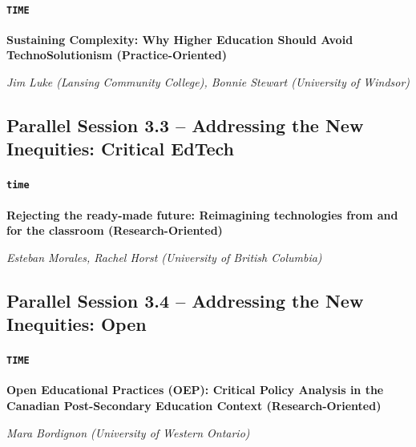 \documentclass[
]{book}
\begin{document}
\begin{secondary}
\hypertarget{time}{%
\paragraph{\texorpdfstring{\texttt{TIME}}{TIME}}\label{time}}

\textbf{Sustaining Complexity: Why Higher Education Should Avoid
TechnoSolutionism (Practice-Oriented)}

\emph{Jim Luke (Lansing Community College), Bonnie Stewart (University
of Windsor)}
\end{secondary}

\hypertarget{parallel-session-3.3-addressing-the-new-inequities-critical-edtech}{%
\subsection*{Parallel Session 3.3 -- Addressing the New Inequities: Critical EdTech}\label{parallel-session-3.3-addressing-the-new-inequities-critical-edtech}}

\begin{secondary}
\hypertarget{time}{%
\paragraph{\texorpdfstring{\texttt{time}}{time}}\label{time}}

\textbf{Rejecting the ready-made future: Reimagining technologies from
and for the classroom (Research-Oriented)}

\emph{Esteban Morales, Rachel Horst (University of British Columbia)}
\end{secondary}

\hypertarget{parallel-session-3.4-addressing-the-new-inequities-open}{%
\subsection*{Parallel Session 3.4 -- Addressing the New Inequities: Open}\label{parallel-session-3.4-addressing-the-new-inequities-open}}

\begin{secondary}
\hypertarget{time}{%
\paragraph{\texorpdfstring{\texttt{TIME}}{TIME}}\label{time}}

\textbf{Open Educational Practices (OEP): Critical Policy Analysis in
the Canadian Post-Secondary Education Context (Research-Oriented)}

\emph{Mara Bordignon (University of Western Ontario)}
\end{secondary}
\end{document}
